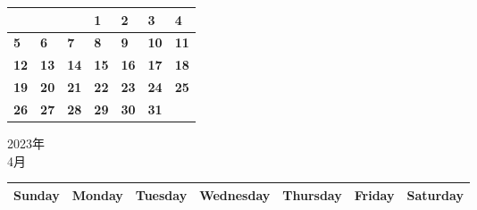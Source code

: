 \documentclass[a4paper,landscape]{jsarticle}
\newcommand{\dig}{\hspace{29mm}}
\newcommand{\tdig}{\hspace{27mm}}
\newcommand{\LBF}{\LARGE\textbf}
\begin{document}
\begingroup
\renewcommand{\arraystretch}{4}
\begin{tabular}{|p{32mm}|p{32mm}|p{32mm}|p{32mm}|p{32mm}|p{32mm}|p{32mm}|}
\hline
&&&\raisebox{30pt} {\dig\LBF{1}}&\raisebox{30pt} {\dig\LBF{2}}&\raisebox{30pt} {\dig\LBF{3}}&\raisebox{30pt} {\dig\LBF{4}}\\
\hline
\raisebox{30pt} {\dig\LBF{5}}&\raisebox{30pt} {\dig\LBF{6}}&\raisebox{30pt} {\dig\LBF{7}}&\raisebox{30pt} {\dig\LBF{8}}&\raisebox{30pt} {\dig\LBF{9}}&\raisebox{30pt} {\tdig\LBF{10}}&\raisebox{30pt} {\tdig\LBF{11}}\\
\hline
\raisebox{30pt} {\tdig\LBF{12}}&\raisebox{30pt} {\tdig\LBF{13}}&\raisebox{30pt} {\tdig\LBF{14}}&\raisebox{30pt} {\tdig\LBF{15}}&\raisebox{30pt} {\tdig\LBF{16}}&\raisebox{30pt} {\tdig\LBF{17}}&\raisebox{30pt} {\tdig\LBF{18}}\\
\hline
\raisebox{30pt} {\tdig\LBF{19}}&\raisebox{30pt} {\tdig\LBF{20}}&\raisebox{30pt} {\tdig\LBF{21}}&\raisebox{30pt} {\tdig\LBF{22}}&\raisebox{30pt} {\tdig\LBF{23}}&\raisebox{30pt} {\tdig\LBF{24}}&\raisebox{30pt} {\tdig\LBF{25}}\\
\hline
\raisebox{30pt} {\tdig\LBF{26}}&\raisebox{30pt} {\tdig\LBF{27}}&\raisebox{30pt} {\tdig\LBF{28}}&\raisebox{30pt} {\tdig\LBF{29}}&\raisebox{30pt} {\tdig\LBF{30}}&\raisebox{30pt} {\tdig\LBF{31}}&\\
\hline
\end{tabular}
\endgroup
\newpage\begin{center}
	\LARGE 2023年\\
	\LARGE 4月
\end{center}

\begingroup
\renewcommand{\arraystretch}{1.4}
\begin{tabular}{|>{\centering\arraybackslash}p{32mm}|>{\centering\arraybackslash}p{32mm}|>{\centering\arraybackslash}p{32mm}|>{\centering\arraybackslash}p{32mm}|>{\centering\arraybackslash}p{32mm}|>{\centering\arraybackslash}p{32mm}|>{\centering\arraybackslash}p{32mm}|}
\hline
\large Sunday&\large Monday &\large Tuesday&\large Wednesday&\large Thursday&\large Friday&\large Saturday\\
\hline
\end{tabular}
\endgroup
\end{document}
